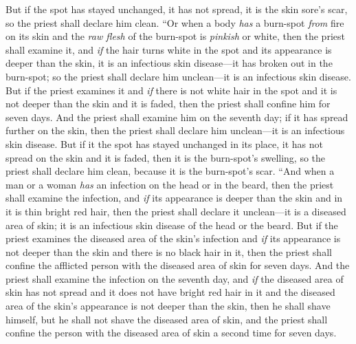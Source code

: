 \begin{biblechapter}
\verse But if the spot has stayed unchanged, it has not spread, it is the skin sore’s scar, so the priest shall declare him clean.
\verse “Or when a body \textit{has} a burn-spot \textit{from} fire on its skin and the \textit{raw flesh} of the burn-spot is \textit{pinkish} or white,
\verse then the priest shall examine it, and \textit{if} the hair turns white in the spot and its appearance is deeper than the skin, it is an infectious skin disease—it has broken out in the burn-spot; so the priest shall declare him unclean—it is an infectious skin disease.
\verse But if the priest examines it and \textit{if} there is not white hair in the spot and it is not deeper than the skin and it is faded, then the priest shall confine him for seven days.
\verse And the priest shall examine him on the seventh day; if it has spread further on the skin, then the priest shall declare him unclean—it is an infectious skin disease.
\verse But if it the spot has stayed unchanged in its place, it has not spread on the skin and it is faded, then it is the burn-spot’s swelling, so the priest shall declare him clean, because it is the burn-spot’s scar.
\verse “And when a man or a woman \textit{has} an infection on the head or in the beard,
\verse then the priest shall examine the infection, and \textit{if} its appearance is deeper than the skin and in it is thin bright red hair, then the priest shall declare it unclean—it is a diseased area of skin; it is an infectious skin disease of the head or the beard.
\verse But if the priest examines the diseased area of the skin’s infection and \textit{if} its appearance is not deeper than the skin and there is no black hair in it, then the priest shall confine the afflicted person with the diseased area of skin for seven days.
\verse And the priest shall examine the infection on the seventh day, and \textit{if} the diseased area of skin has not spread and it does not have bright red hair in it and the diseased area of the skin’s appearance is not deeper than the skin,
\verse then he shall shave himself, but he shall not shave the diseased area of skin, and the priest shall confine the person with the diseased area of skin a second time for seven days.

\end{biblechapter}
